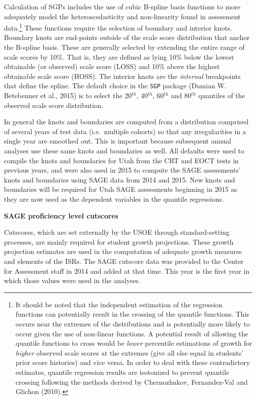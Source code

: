 \documentclass[12pt]{article}
\begin{document}
Calculation of SGPs includes the use of cubic B-spline basis functions
to more adequately model the heteroscedasticity and non-linearity found
in assessment data.\footnote{It should be noted that the independent
  estimation of the regression functions can potentially result in the
  crossing of the quantile functions. This occurs near the extremes of
  the distributions and is potentially more likely to occur given the
  use of non-linear functions. A potential result of allowing the
  quantile functions to cross would be \emph{lower} percentile
  estimations of growth for \emph{higher} observed scale scores at the
  extremes (give all else equal in students' prior score histories) and
  vice versa. In order to deal with these contradictory estimates,
  quantile regression results are isotonized to prevent quantile
  crossing following the methods derived by Chernozhukov, Fernandez-Val
  and Glichon (2010).} These functions require the selection of boundary
and interior knots. Boundary knots are end-points outside of the scale
score distribution that anchor the B-spline basis. These are generally
selected by extending the entire range of scale scores by 10\%. That is,
they are defined as lying 10\% below the lowest obtainable (or observed)
scale score (LOSS) and 10\% above the highest obtainable scale score
(HOSS). The interior knots are the \emph{internal} breakpoints that
define the spline. The default choice in the \texttt{SGP} package
(Damian W. Betebenner et al., 2015) is to select the 20\(^{th}\),
40\(^{th}\), 60\(^{th}\) and 80\(^{th}\) quantiles of the observed scale
score distribution.

In general the knots and boundaries are computed from a distribution
comprised of several years of test data (i.e.~multiple cohorts) so that
any irregularities in a single year are smoothed out. This is important
because subsequent annual analyses use these same knots and boundaries
as well. All defaults were used to compile the knots and boundaries for
Utah from the CRT and EOCT tests in previous years, and were also used
in 2015 to compute the SAGE assessments' knots and boundaries using SAGE
data from 2014 and 2015. New knots and boundaries will be required for
Utah SAGE assessments beginning in 2015 as they are now used as the
dependent variables in the quantile regressions.

\textbf{SAGE proficiency level cutscores}

Cutscores, which are set externally by the USOE through standard-setting
processes, are mainly required for student growth projections. These
growth projection estimates are used in the computation of adequate
growth measures and elements of the ISRs. The SAGE cutscore data was
provided to the Center for Assessment staff in 2014 and added at that
time. This year is the first year in which those values were used in the
analyses.
\end{document}
